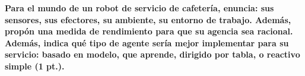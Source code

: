 \textbf{Para el mundo de un robot de servicio de cafetería, enuncia: sus sensores, sus efectores, su ambiente, su entorno de trabajo. Además, propón una medida de rendimiento para que su agencia sea racional. Además, indica qué tipo de agente sería mejor implementar para su servicio: basado en modelo, que aprende, dirigido por tabla, o reactivo simple (1 pt.).}